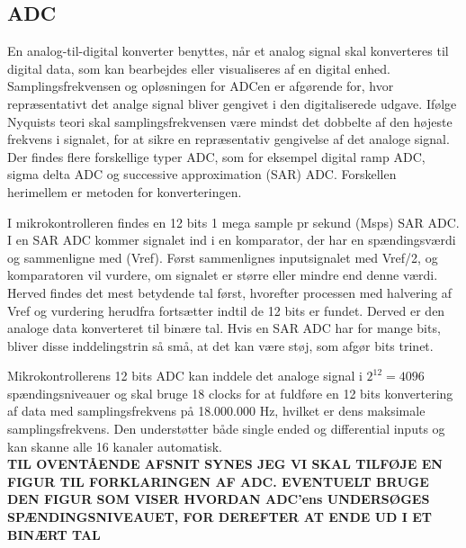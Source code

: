 \subsection{ADC}
En analog-til-digital konverter benyttes, når et analog signal skal konverteres til digital data, som kan bearbejdes eller visualiseres af en digital enhed. Samplingsfrekvensen og opløsningen for ADCen er afgørende for, hvor repræsentativt det analge signal bliver gengivet i den digitaliserede udgave. Ifølge Nyquists teori skal samplingsfrekvensen være mindst det dobbelte af den højeste frekvens i signalet, for at sikre en repræsentativ gengivelse af det analoge signal. Der findes flere forskellige typer ADC, som for eksempel digital ramp ADC, sigma delta ADC og successive approximation (SAR) ADC. Forskellen herimellem er metoden for konverteringen. \citep{Moore2004,Sheingold2014}

I mikrokontrolleren findes en 12 bits 1 mega sample pr sekund (Msps) SAR ADC. I en SAR ADC kommer signalet ind i en komparator, der har en spændingsværdi og sammenligne med (Vref). Først sammenlignes inputsignalet med Vref/2, og komparatoren vil vurdere, om signalet er større eller mindre end denne værdi. Herved findes det mest betydende tal først, hvorefter processen med halvering af Vref og vurdering herudfra fortsætter indtil de 12 bits er fundet. Derved er den analoge data konverteret til binære tal. Hvis en SAR ADC har for mange bits, bliver disse inddelingstrin så små, at det kan være støj, som afgør bits trinet.

Mikrokontrollerens 12 bits ADC kan inddele det analoge signal i $2^{12} = 4096$ spændingsniveauer og skal bruge 18 clocks for at fuldføre en 12 bits konvertering af data med samplingsfrekvens på 18.000.000 Hz, hvilket er dens maksimale samplingsfrekvens. Den understøtter både single ended og differential inputs og kan skanne alle 16 kanaler automatisk. \citep{Semiconductor20164200M,Moore2004} \\
\newline \textbf{TIL OVENTÅENDE AFSNIT SYNES JEG VI SKAL TILFØJE EN FIGUR TIL FORKLARINGEN AF ADC. EVENTUELT BRUGE DEN FIGUR SOM VISER HVORDAN ADC'ens UNDERSØGES SPÆNDINGSNIVEAUET, FOR DEREFTER AT ENDE UD I ET BINÆRT TAL}


